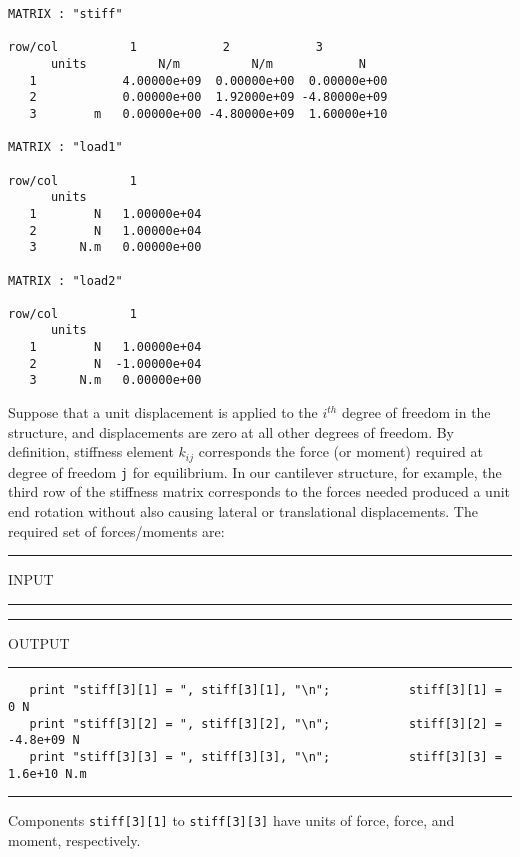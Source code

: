 \begin{footnotesize}
\begin{verbatim}
MATRIX : "stiff"

row/col          1            2            3          
      units          N/m          N/m            N   
   1            4.00000e+09  0.00000e+00  0.00000e+00
   2            0.00000e+00  1.92000e+09 -4.80000e+09
   3        m   0.00000e+00 -4.80000e+09  1.60000e+10

MATRIX : "load1"

row/col          1          
      units             
   1        N   1.00000e+04
   2        N   1.00000e+04
   3      N.m   0.00000e+00

MATRIX : "load2"

row/col          1          
      units             
   1        N   1.00000e+04
   2        N  -1.00000e+04
   3      N.m   0.00000e+00
\end{verbatim}
\end{footnotesize}

\vspace{0.15 in}\noindent
Suppose that a unit displacement is applied to the ${i^{th}}$ degree of
freedom in the structure, and displacements are zero at all other degrees of freedom.
By definition, stiffness element ${k_{ij}}$ corresponds the force (or moment)
required at degree of freedom {\tt j} for equilibrium. In our cantilever
structure, for example, the third row of the stiffness matrix corresponds to
the forces needed produced a unit end rotation without also causing lateral
or translational displacements. The required set of forces/moments are:

\vspace{0.15 in}
\begin{footnotesize}
\noindent
\rule{1.2 in}{0.035 in} INPUT \rule{1.2 in}{0.035 in}\hspace{0.1 in}
\rule{1.3 in}{0.035 in} OUTPUT\rule{1.3 in}{0.035 in}
\begin{verbatim}
   print "stiff[3][1] = ", stiff[3][1], "\n";           stiff[3][1] =        0 N
   print "stiff[3][2] = ", stiff[3][2], "\n";           stiff[3][2] = -4.8e+09 N
   print "stiff[3][3] = ", stiff[3][3], "\n";           stiff[3][3] =  1.6e+10 N.m
\end{verbatim}
\rule{6.25 in}{0.035 in}
\end{footnotesize}

\vspace{0.15 in}\noindent
Components {\tt stiff[3][1]} to {\tt stiff[3][3]}
have units of force, force, and moment, respectively.

